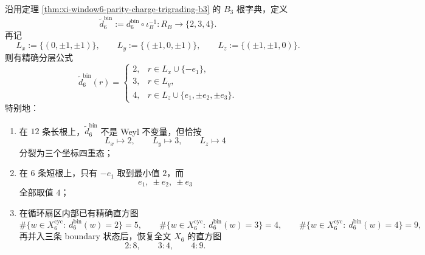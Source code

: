 \begin{theorem}\label{thm:xi-window6-dbin-coordinate-quadruple-stratification}
沿用定理 \ref{thm:xi-window6-parity-charge-trigrading-b3} 的 \(B_3\) 根字典，定义
\[
\widetilde d_6^{\mathrm{bin}}
:=
d_6^{\mathrm{bin}}\circ \iota_B^{-1}:R_B\to\{2,3,4\}.
\]
再记
\[
L_x:=\{(0,\pm 1,\pm 1)\},
\qquad
L_y:=\{(\pm 1,0,\pm 1)\},
\qquad
L_z:=\{(\pm 1,\pm 1,0)\}.
\]
则有精确分层公式
\[
\widetilde d_6^{\mathrm{bin}}(r)=
\begin{cases}
2,& r\in L_x\cup \{-e_1\},\\[2mm]
3,& r\in L_y,\\[2mm]
4,& r\in L_z\cup \{e_1,\pm e_2,\pm e_3\}.
\end{cases}
\]
特别地：
\begin{enumerate}
  \item 在 \(12\) 条长根上，\(\widetilde d_6^{\mathrm{bin}}\) 不是 Weyl 不变量，但恰按
  \[
  L_x\mapsto 2,
  \qquad
  L_y\mapsto 3,
  \qquad
  L_z\mapsto 4
  \]
  分裂为三个坐标四重态；
  \item 在 \(6\) 条短根上，只有 \(-e_1\) 取到最小值 \(2\)，而
  \[
  e_1,\ \pm e_2,\ \pm e_3
  \]
  全部取值 \(4\)；
  \item 在循环扇区内部已有精确直方图
  \[
  \#\{w\in X_6^{\mathrm{cyc}}:\ d_6^{\mathrm{bin}}(w)=2\}=5,\qquad
  \#\{w\in X_6^{\mathrm{cyc}}:\ d_6^{\mathrm{bin}}(w)=3\}=4,\qquad
  \#\{w\in X_6^{\mathrm{cyc}}:\ d_6^{\mathrm{bin}}(w)=4\}=9,
  \]
  再并入三条 boundary 状态后，恢复全文 \(X_6\) 的直方图
  \[
  2:8,\qquad 3:4,\qquad 4:9.
  \]
\end{enumerate}
\end{theorem}
